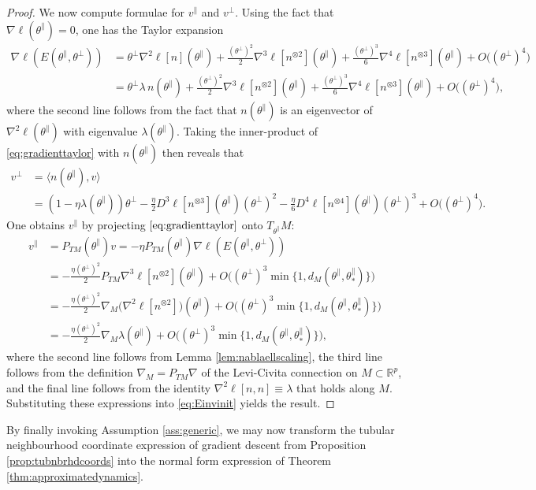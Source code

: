 \documentclass{article}
\newcommand{\RB}{\mathbb{R}}
\newcommand{\tpa}{\theta^{\parallel}}
\newcommand{\tpe}{\theta^{\perp}}
\theoremstyle{plain}
\theoremstyle{definition}
\theoremstyle{remark}
\begin{document}
\begin{proof}
    We now compute formulae for $v^{\parallel}$ and $v^{\perp}$. Using the fact that $\nabla\ell(\tpa) = 0$, one has the Taylor expansion
    \begin{align}
        \nabla\ell(E(\tpa,\tpe)) &= \tpe\nabla^2\ell[n](\tpa) + \frac{(\tpe)^2}{2}\nabla^3\ell[n^{\otimes 2}](\tpa) + \frac{(\tpe)^3}{6}\nabla^4\ell[n^{\otimes 3}](\tpa) + O\big((\tpe)^4\big)\\&=\tpe\lambda\,n(\tpa) + \frac{(\tpe)^2}{2}\nabla^3\ell[n^{\otimes 2}](\tpa) + \frac{(\tpe)^3}{6}\nabla^4\ell[n^{\otimes 3}](\tpa) + O\big((\tpe)^4\big),\label{eq:gradienttaylor}
    \end{align}
    where the second line follows from the fact that $n(\tpa)$ is an eigenvector of $\nabla^2\ell(\tpa)$ with eigenvalue $\lambda(\tpa)$. Taking the inner-product of \eqref{eq:gradienttaylor} with $n(\tpa)$ then reveals that
    \begin{align}
        v^{\perp} &= \langle n(\tpa),v\rangle\\&=(1-\eta\lambda(\tpa))\tpe - \frac{\eta}{2}D^3\ell[n^{\otimes 3}](\tpa)(\tpe)^2 - \frac{\eta}{6}D^4\ell[n^{\otimes 4}](\tpa) (\tpe)^3+O\big((\tpe)^4\big).
    \end{align}
    One obtains $v^{\parallel}$ by projecting $\eqref{eq:gradienttaylor}$ onto $T_{\tpa}M$:
    \begin{align}
        v^{\parallel} &= P_{TM}(\tpa)v = -\eta P_{TM}(\tpa)\nabla\ell(E(\tpa,\tpe))\\&=-\frac{\eta(\tpe)^2}{2}P_{TM}\nabla^3\ell[n^{\otimes 2}](\tpa) + O\big((\tpe)^3\min\{1,d_M(\tpa,\tpa_*)\}\big)\\&=-\frac{\eta(\tpe)^2}{2}\nabla_M\big(\nabla^2\ell[n^{\otimes 2}]\big)(\tpa) + O\big((\tpe)^3\min\{1,d_M(\tpa,\tpa_*)\}\big)\\&=-\frac{\eta(\tpe)^2}{2}\nabla_M\lambda(\tpa) + O\big((\tpe)^3\min\{1,d_M(\tpa,\tpa_*)\}\big),
    \end{align}
    where the second line follows from Lemma \ref{lem:nablaellscaling}, the third line follows from the definition $\nabla_M =P_{TM}\nabla$ of the Levi-Civita connection on $M\subset\RB^p$, and the final line follows from the identity $\nabla^2\ell[n,n]\equiv \lambda$ that holds along $M$.  Substituting these expressions into \eqref{eq:Einvinit} yields the result.
\end{proof}

By finally invoking Assumption \ref{ass:generic}, we may now transform the tubular neighbourhood coordinate expression of gradient descent from Proposition \ref{prop:tubnbrhdcoords} into the normal form expression of Theorem \ref{thm:approximatedynamics}.
\end{document}
